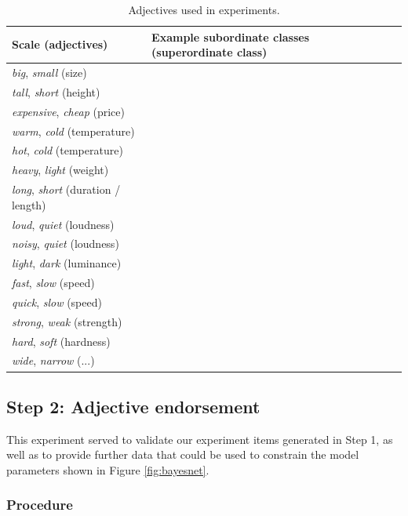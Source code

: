 \documentclass[doc]{apa6}
\begin{document}
\begin{table}[ht]
\centering
\begingroup\fontsize{10pt}{11pt}\selectfont
\begin{tabularx}{\textwidth}{lll}
  \hline
Scale (adjectives) & Example subordinate classes (superordinate class) \\ 
  \hline
  \emph{big}, \emph{small} (size) & \\
\emph{tall}, \emph{short} (height) & \\ 
  \emph{expensive}, \emph{cheap} (price) & \\ 
    \emph{warm}, \emph{cold} (temperature) &  \\ 
    \emph{hot}, \emph{cold} (temperature) &  \\ 
  \emph{heavy}, \emph{light} (weight) &  \\ 
  \emph{long}, \emph{short} (duration / length) &  \\ 
  \emph{loud}, \emph{quiet} (loudness) &  \\ 
  \emph{noisy}, \emph{quiet} (loudness) &  \\ 
  \emph{light}, \emph{dark} (luminance) &  \\
  \emph{fast}, \emph{slow} (speed) &  \\
  \emph{quick}, \emph{slow} (speed) &  \\
  \emph{strong}, \emph{weak} (strength) &  \\
  \emph{hard}, \emph{soft} (hardness) &  \\
  \emph{wide}, \emph{narrow} (...) &  \\
   \hline
\end{tabularx}
\caption{Adjectives used in experiments.} 
\label{tab:1}
\endgroup
\end{table}

\subsubsection{}


\subsection{Step 2: Adjective endorsement}

This experiment served to validate our experiment items generated in Step 1, as well as to provide further data that could be used to constrain the model parameters shown in Figure \ref{fig:bayesnet}.

\subsubsection{Procedure}
\end{document}
